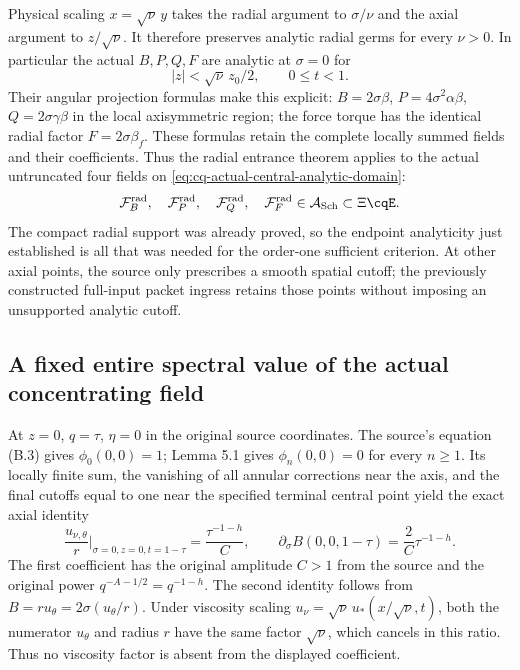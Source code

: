 Physical scaling $x=\sqrt\nu\,y$ takes the radial argument
to $\sigma/\nu$ and the axial argument to $z/\sqrt\nu$.
It therefore preserves analytic radial germs for every
$\nu>0$. In particular the actual $B,P,Q,F$ are analytic at
$\sigma=0$ for
\begin{equation}
 |z|<\sqrt\nu\,z_0/2,\qquad 0\leq t<1.
 \label{eq:cq-actual-central-analytic-domain}
\end{equation}
Their angular projection formulas make this explicit:
$B=2\sigma\beta$, $P=4\sigma^2\alpha\beta$,
$Q=2\sigma\gamma\beta$ in the local axisymmetric region;
the force torque has the identical radial factor
$F=2\sigma\beta_f$. These formulas retain the complete
locally summed fields and their coefficients. Thus the
radial entrance theorem applies to the actual untruncated
four fields on \eqref{eq:cq-actual-central-analytic-domain}:
\[
 \mathcal F_B^{\rm rad},\quad\mathcal F_P^{\rm rad},\quad
 \mathcal F_Q^{\rm rad},\quad\mathcal F_F^{\rm rad}
           \in\mathcal A_{\rm Sch}\subset\Xi\cqE .
\]
The compact radial support was already proved, so the endpoint
analyticity just established is all that was needed for the
order-one sufficient criterion. At other axial points, the
source only prescribes a smooth spatial cutoff; the previously
constructed full-input packet ingress retains those points
without imposing an unsupported analytic cutoff.

\subsection{A fixed entire spectral value of the actual concentrating field}

At $z=0$, $q=\tau$, $\eta=0$ in the original source coordinates.
The source's equation (B.3) gives $\phi_0(0,0)=1$; Lemma 5.1
gives $\phi_n(0,0)=0$ for every $n\geq1$.
Its locally finite sum, the vanishing of all annular corrections
near the axis, and the final cutoffs equal to one near the
specified terminal central point yield the exact axial identity
\begin{equation}
 \frac{u_{\nu,\theta}}r\bigg|_{\sigma=0,z=0,t=1-\tau}
          =\frac{\tau^{-1-h}}C,\qquad
 \partial_\sigma B(0,0,1-\tau)=\frac2C\tau^{-1-h}.
 \label{eq:cq-actual-axis-angular-coefficient}
\end{equation}
The first coefficient has the original amplitude $C>1$ from
the source and the original power
$q^{-A-1/2}=q^{-1-h}$. The second identity follows from
$B=r u_\theta=2\sigma(u_\theta/r)$.
Under viscosity scaling $u_\nu=\sqrt\nu\,u_*(x/\sqrt\nu,t)$,
both the numerator $u_\theta$ and radius $r$ have the same
factor $\sqrt\nu$, which cancels in this ratio. Thus no
viscosity factor is absent from the displayed coefficient.

